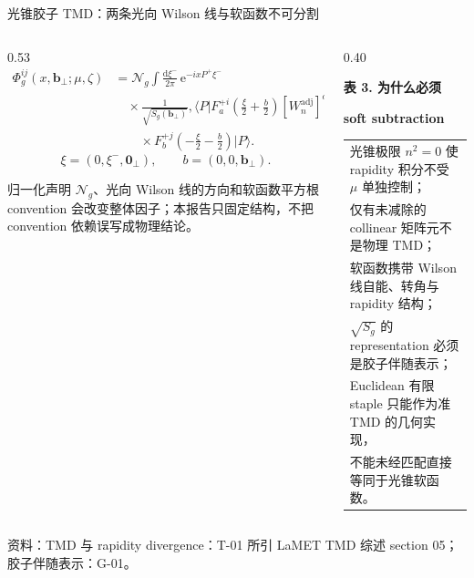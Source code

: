 \documentclass[UTF8,aspectratio=169,11pt]{ctexbeamer}
\newcommand{\source}[1]{%
  \par\vspace{-0.08em}%
  \noindent\parbox[t]{0.97\linewidth}{\raggedright\scriptsize\color{muted}资料：#1}\par}
\newcommand{\dd}{\mathrm{d}}
\newcommand{\e}{\mathrm{e}}
\newcommand{\ad}{\mathrm{adj}}
\begin{document}
\begin{frame}[t]{光锥胶子 TMD：两条光向 Wilson 线与软函数不可分割}
  \begin{columns}[T,totalwidth=\textwidth]
    \begin{column}{0.53\textwidth}
      {\scriptsize
      \begin{align*}
        \Phi_g^{ij}(x,\boldsymbol b_\perp;\mu,\zeta)
        &=\mathcal N_g\int\frac{\dd\xi^-}{2\pi}
        \,\e^{-ixP^+\xi^-}\\[-0.15em]
        &\quad\times\frac{1}{\sqrt{S_g(\boldsymbol b_\perp)}},
        \langle P|F^{+i}_a(\tfrac\xi2+\tfrac b2)
        [W_n^{\ad}]^{ab}\\[-0.15em]
        &\qquad\times F^{+j}_b(-\tfrac\xi2-\tfrac b2)|P\rangle .
      \end{align*}}
      \[
        \xi=(0,\xi^-,\boldsymbol0_\perp),\qquad
        b=(0,0,\boldsymbol b_\perp).
      \]
      \begin{block}{归一化声明}
        $\mathcal N_g$、光向 Wilson 线的方向和软函数平方根 convention 会改变整体因子；本报告只固定结构，不把 convention 依赖误写成物理结论。
      \end{block}
    \end{column}
    \begin{column}{0.40\textwidth}
      \begin{center}
      \textbf{表 3. 为什么必须}\par
      \textbf{soft subtraction}
      \vspace{0.12em}
      {\scriptsize\begin{tabular}{@{}p{\linewidth}@{}}
        \toprule
        光锥极限 $n^2=0$ 使 rapidity 积分不受 $\mu$ 单独控制；\\
        仅有未减除的 collinear 矩阵元不是物理 TMD；\\
        软函数携带 Wilson 线自能、转角与 rapidity 结构；\\
        $\sqrt{S_g}$ 的 representation 必须是胶子伴随表示；\\
        Euclidean 有限 staple 只能作为准 TMD 的几何实现，\\
        不能未经匹配直接等同于光锥软函数。\\
        \bottomrule
      \end{tabular}}
      \end{center}
    \end{column}
  \end{columns}
  \source{TMD 与 rapidity divergence：T-01 所引 LaMET TMD 综述 section 05；胶子伴随表示：G-01。}
\end{frame}
\end{document}
